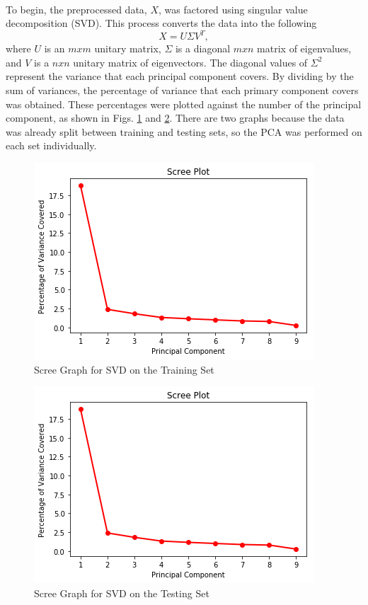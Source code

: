 \documentclass[12pt]{article}
\begin{document}
    \paragraph{}
    To begin, the preprocessed data, $X$, was factored using singular value decomposition (SVD). This process converts the data into the following
    \begin{equation}
    X = U \Sigma V^T,
    \end{equation}
    where $U$ is an $m x m$ unitary matrix, $\Sigma$ is a diagonal $m x n$ matrix of eigenvalues, and $V$ is a $n x n$ unitary matrix of eigenvectors. The diagonal values of $\Sigma^2$ represent the variance that each principal component covers. By dividing by the sum of variances, the percentage of variance that each primary component covers was obtained. These percentages were plotted against the number of the principal component, as shown in Figs. \ref{ScreeTrain} and \ref{ScreeTest}. There are two graphs because the data was already split between training and testing sets, so the PCA was performed on each set individually.
    \begin{center}
        \begin{figure}[H]
    	    \includegraphics[width=0.75\linewidth]{Pictures/screeTrain.png}
    	    \caption{Scree Graph for SVD on the Training Set}
    	    \label{ScreeTrain}
        \end{figure}
    \end{center}
    \begin{center}
        \begin{figure}[H]
    	    \includegraphics[width=0.75\linewidth]{Pictures/screeTest.png}
    	    \caption{Scree Graph for SVD on the Testing Set}
    	    \label{ScreeTest}
        \end{figure}
    \end{center}
\end{document}
